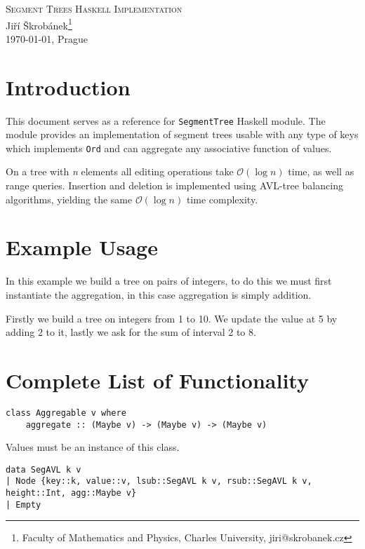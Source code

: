 \documentclass[a4paper,10pt,openany]{article}
\begin{document}
\begin{center}
{\huge \textsc{Segment Trees Haskell Implementation}}\\
\vspace{10mm} {\large Jiří Škrobánek\footnote[1]{Faculty of Mathematics and Physics, Charles University, {\ttfamily jiri@skrobanek.cz}}}\\
\vspace{10mm}\today, Prague

\end{center}

\section*{Introduction}
This document serves as a reference for \texttt{SegmentTree} Haskell module. The module provides an implementation of segment trees usable with any type of keys which implements \texttt{Ord} and can aggregate any associative function of values.

On a tree with \textit{n} elements all editing operations take $\mathcal{O}(\log n)$ time, as well as range queries. Insertion and deletion is implemented using AVL-tree balancing algorithms, yielding the same $\mathcal{O}(\log n)$ time complexity.

\section*{Example Usage}

In this example we build a tree on pairs of integers, to do this we must first instantiate the aggregation, in this case aggregation is simply addition. 

Firstly we build a tree on integers from 1 to 10. We update the value at 5 by adding 2 to it, lastly we ask for the sum of interval 2 to 8.



\section*{Complete List of Functionality}
\begin{lstlisting}
class Aggregable v where
    aggregate :: (Maybe v) -> (Maybe v) -> (Maybe v)
\end{lstlisting}
Values must be an instance of this class.
\begin{lstlisting}
data SegAVL k v
| Node {key::k, value::v, lsub::SegAVL k v, rsub::SegAVL k v, height::Int, agg::Maybe v}
| Empty 
\end{lstlisting}
\end{document}
